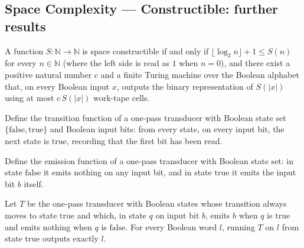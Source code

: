 \subsection*{Space Complexity --- Constructible: further results}

\begin{theorem}
\label{Complexity.spaceConstructible_iff}
\leanok
{}
A function $S:\mathbb{N}\to\mathbb{N}$ is space constructible if and only if
$\lfloor\log_2 n\rfloor+1\le S(n)$ for every $n\in\mathbb{N}$ (where the left side is
read as $1$ when $n=0$), and there exist a positive natural number $c$ and a finite
Turing machine over the Boolean alphabet that, on every Boolean input $x$, outputs the
binary representation of $S(|x|)$ using at most $c\,S(|x|)$ work-tape cells.
\end{theorem}

\begin{definition}
\label{Complexity.scp_tailδ}
\leanok
Define the transition function of a one-pass transducer with Boolean state set
$\{\mathrm{false},\mathrm{true}\}$ and Boolean input bits: from every state, on every
input bit, the next state is $\mathrm{true}$, recording that the first bit has been read.
\end{definition}

\begin{definition}
\label{Complexity.scp_tailO}
\leanok
Define the emission function of a one-pass transducer with Boolean state set: in state
$\mathrm{false}$ it emits nothing on any input bit, and in state $\mathrm{true}$ it emits
the input bit $b$ itself.
\end{definition}

\begin{theorem}
\label{Complexity.scp_transduce_copy}
\leanok
{}
Let $T$ be the one-pass transducer with Boolean states whose transition always moves to
state $\mathrm{true}$ and which, in state $q$ on input bit $b$, emits $b$ when $q$ is
$\mathrm{true}$ and emits nothing when $q$ is $\mathrm{false}$. For every Boolean word
$l$, running $T$ on $l$ from state $\mathrm{true}$ outputs exactly $l$.
\end{theorem}

